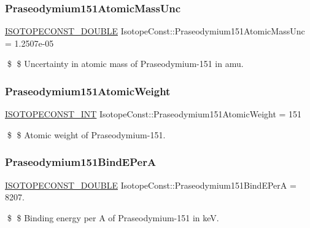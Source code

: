 \subsubsection{\texorpdfstring{Praseodymium151\+Atomic\+Mass\+Unc}{Praseodymium151AtomicMassUnc}}
{\footnotesize\ttfamily \mbox{\hyperlink{group___isotope_const-_macros_ga8f45a7272ce02c0b4c65c44636ed719a}{I\+S\+O\+T\+O\+P\+E\+C\+O\+N\+S\+T\+\_\+\+D\+O\+U\+B\+LE}} Isotope\+Const\+::\+Praseodymium151\+Atomic\+Mass\+Unc = 1.\+2507e-\/05}

\$ \$ Uncertainty in atomic mass of Praseodymium-\/151 in amu. \mbox{\label{group___isotope_const-_praseodymium-_pr151_ga28d740e6d0ee5df5df0502c75c7fc738}} 
\subsubsection{\texorpdfstring{Praseodymium151\+Atomic\+Weight}{Praseodymium151AtomicWeight}}
{\footnotesize\ttfamily \mbox{\hyperlink{group___isotope_const-_macros_ga5f18360b3e99483a35c32d789e62621c}{I\+S\+O\+T\+O\+P\+E\+C\+O\+N\+S\+T\+\_\+\+I\+NT}} Isotope\+Const\+::\+Praseodymium151\+Atomic\+Weight = 151}

\$ \$ Atomic weight of Praseodymium-\/151. \mbox{\label{group___isotope_const-_praseodymium-_pr151_gac3ee3ff2724db3de6954f7cdc6c5588a}} 
\subsubsection{\texorpdfstring{Praseodymium151\+Bind\+E\+PerA}{Praseodymium151BindEPerA}}
{\footnotesize\ttfamily \mbox{\hyperlink{group___isotope_const-_macros_ga8f45a7272ce02c0b4c65c44636ed719a}{I\+S\+O\+T\+O\+P\+E\+C\+O\+N\+S\+T\+\_\+\+D\+O\+U\+B\+LE}} Isotope\+Const\+::\+Praseodymium151\+Bind\+E\+PerA = 8207.}

\$ \$ Binding energy per A of Praseodymium-\/151 in keV. \mbox{\label{group___isotope_const-_praseodymium-_pr151_gab49293d528a071967a723df8ac2473eb}} 
